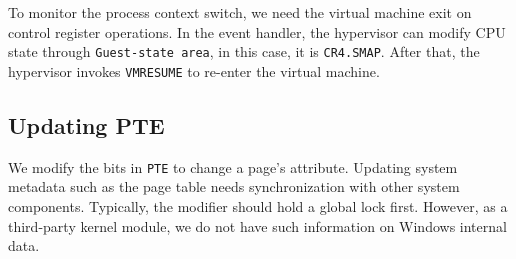 
To monitor the process context switch, we need the virtual machine exit on control register operations. In the event handler, the hypervisor can modify CPU state through \texttt{Guest-state area}, in this case, it is \texttt{CR4.SMAP}. After that, the hypervisor invokes \texttt{VMRESUME} to re-enter the virtual machine.

\subsection{Updating PTE}

We modify the bits in \texttt{PTE} to change a page's attribute. Updating system metadata such as the page table needs synchronization with other system components. Typically, the modifier should hold a global lock first. However, as a third-party kernel module, we do not have such information on Windows internal data.


%


